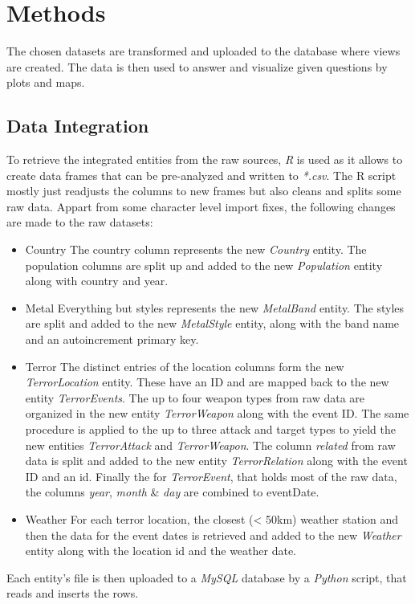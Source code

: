 \section{Methods}
The chosen datasets are transformed and uploaded to the database where views are created. The data is then used to answer and visualize given questions by plots and maps.


\subsection{Data Integration}
To retrieve the integrated entities from the raw sources, \emph{R} is used as it allows to create data frames that can be pre-analyzed and written to \emph{*.csv}. The R script mostly just readjusts the columns to new frames but also cleans and splits some raw data. Appart from some character level import fixes, the following changes are made to the raw datasets:
\begin{itemize}
\item Country
The country column represents the new \emph{Country} entity. The population columns are split up and added to the new \emph{Population} entity along with country and year. 
\item Metal
Everything but styles represents the new \emph{MetalBand} entity. The styles are split and added to the new \emph{MetalStyle} entity, along with the band name and an autoincrement primary key.
\item Terror
The distinct entries of the location columns form the new \emph{TerrorLocation} entity. These have an ID and are mapped back to the new entity \emph{TerrorEvents}. The up to four weapon types from raw data are organized in the new entity \emph{TerrorWeapon} along with the event ID. The same procedure is applied to the up to three attack and target types to yield the new entities \emph{TerrorAttack} and \emph{TerrorWeapon}. The column \emph{related} from raw data is split and added to the new entity \emph{TerrorRelation} along with the event ID and an id. Finally the for \emph{TerrorEvent}, that holds most of the raw data, the columns \emph{year}, \emph{month} \& \emph{day} are combined to eventDate.
\item Weather
For each terror location, the closest (< 50km) weather station and then the data for the event dates is retrieved and added to the new \emph{Weather} entity along with the location id and the weather date.
\end{itemize}
Each entity's file is then uploaded to a \emph{MySQL} database by a \emph{Python} script, that reads and inserts the rows.


